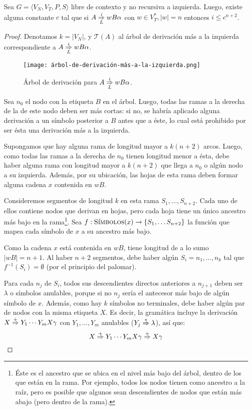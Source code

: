 \begin{theorem*}
    Sea $G = \langle V_N, V_T, P, S \rangle$ libre de contexto y no recursiva a izquierda. Luego, existe alguna constante $c$ tal que si $A \overset{i}{\underset{L}{\Rightarrow}} w B \alpha$ con $w \in V_T^*, |w| = n$ entonces $i \leq c^{n + 2}$.
\end{theorem*}
\begin{proof}
    Denotamos $k = |V_N|$, y $\mathcal T(A)$ al árbol de derivación más a la izquierda correspondiente a $A \overset{i}{\underset{L}{\Rightarrow}} w B \alpha$.
    \begin{figure}[H]
        \centering
        \texttt{[image: árbol-de-derivación-más-a-la-izquierda.png]}
        \caption*{Árbol de derivación para $A \overset{i}{\underset{L}{\Rightarrow}} w B \alpha$.}
    \end{figure}

    Sea $n_0$ el nodo con la etiqueta $B$ en el árbol. Luego, todas las ramas a la derecha de la de este nodo deben ser más cortas: si no, se habría aplicado alguna derivación a un símbolo posterior a $B$ antes que a éste, lo cual está prohibido por ser ésta una derivación más a la izquierda.

    Supongamos que hay alguna rama de longitud mayor a $k (n + 2)$ arcos. Luego, como todas las ramas a la derecha de $n_0$ tienen longitud menor a ésta, debe haber alguna rama con longitud mayor a $k (n + 2)$ que llega a $n_0$ o algún nodo a su izquierda. Además, por su ubicación, las hojas de esta rama deben formar alguna cadena $x$ contenida en $wB$.

    Consideremos segmentos de longitud $k$ en esta rama $S_1, \dots, S_{n + 2}$. Cada uno de ellos contiene nodos que derivan en hojas, pero cada hoja tiene un único ancestro más bajo en la rama\footnote{Éste es el ancestro que se ubica en el nivel más bajo del árbol, dentro de los que están en la rama. Por ejemplo, todos los nodos tienen como ancestro a la raíz, pero es posible que algunos sean descendientes de nodos que están más abajo (pero dentro de la rama).}. Sea $f: \textsc{Símbolos}(x) \to \{S_1, \dots S_{n + 2}\}$ la función que mapea cada símbolo de $x$ a su ancestro más bajo.

    Como la cadena $x$ está contenida en $wB$, tiene longitud de a lo sumo $|wB| = n + 1$. Al haber $n + 2$ segmentos, debe haber algún $S_i = n_1, \dots, n_k$ tal que $f^{-1}(S_i) = \emptyset$ (por el principio del palomar).  
    
    Para cada $n_j$ de $S_i$, todos sus descendientes directos anteriores a $n_{j + 1}$ deben ser $\lambda$ o símbolos anulables, porque si no $n_j$ sería el antecesor más bajo de algún símbolo de $x$. Además, como hay $k$ símbolos no terminales, debe haber algún par de nodos con la misma etiqueta $X$. Es decir, la gramática incluye la derivación $X \overset{+}{\Rightarrow} Y_1 \cdots Y_m X \gamma$ con $Y_1, \dots, Y_m$ anulables ($Y_j \overset{*}{\Rightarrow} \lambda$), así que:
    $$
        X \overset{+}{\Rightarrow} Y_1 \cdots Y_m X \gamma \overset{+}{\Rightarrow} X \gamma
    $$


\end{proof}
